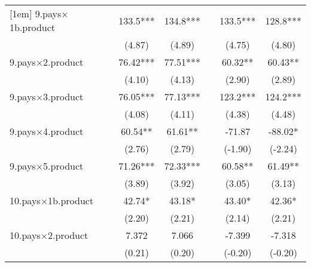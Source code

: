 {\begin{tabular}{l*{6}{c}}
[1em]
9.pays$\times$1b.product   &                     &       133.5***&       134.8***&                     &       133.5***&       128.8***\\
                    &                     &      (4.87)         &      (4.89)         &                     &      (4.75)         &      (4.80)         \\
[1em]
9.pays$\times$2.product    &                     &       76.42***&       77.51***&                     &       60.32** &       60.43** \\
                    &                     &      (4.10)         &      (4.13)         &                     &      (2.90)         &      (2.89)         \\
[1em]
9.pays$\times$3.product    &                     &       76.05***&       77.13***&                     &       123.2***&       124.2***\\
                    &                     &      (4.08)         &      (4.11)         &                     &      (4.38)         &      (4.48)         \\
[1em]
9.pays$\times$4.product    &                     &       60.54** &       61.61** &                     &      -71.87         &      -88.02*  \\
                    &                     &      (2.76)         &      (2.79)         &                     &     (-1.90)         &     (-2.24)         \\
[1em]
9.pays$\times$5.product    &                     &       71.26***&       72.33***&                     &       60.58** &       61.49** \\
                    &                     &      (3.89)         &      (3.92)         &                     &      (3.05)         &      (3.13)         \\
[1em]
10.pays$\times$1b.product  &                     &       42.74*  &       43.18*  &                     &       43.40*  &       42.36*  \\
                    &                     &      (2.20)         &      (2.21)         &                     &      (2.14)         &      (2.21)         \\
[1em]
10.pays$\times$2.product   &                     &       7.372         &       7.066         &                     &      -7.399         &      -7.318         \\
                    &                     &      (0.21)         &      (0.20)         &                     &     (-0.20)         &     (-0.20)         \\

\end{tabular}}
